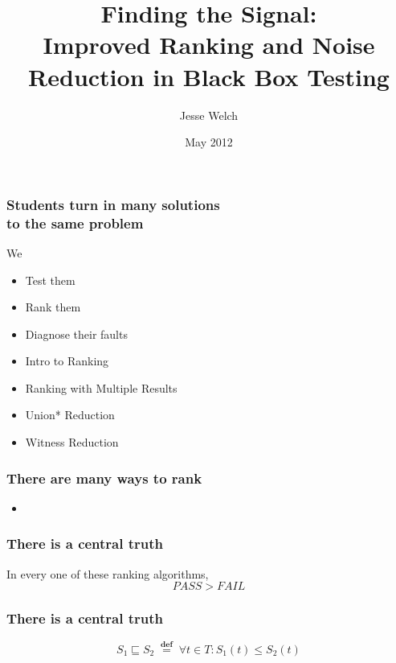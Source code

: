 \documentclass[svgnames,14pt]{beamer}
\title[Finding the Signal]{Finding the Signal:\\
Improved Ranking and Noise Reduction in Black Box Testing}
\author{Jesse Welch}
\institute{Tufts University}
\date{May 2012}
\newcommand\fail{\mathit{FAIL}}
\newcommand\pass{\mathit{PASS}}
\newcommand\defined{\mathrel{\;\stackrel{\scriptscriptstyle\mathbf{def}}{=}\;}}
\theoremstyle{definition}
\begin{document}
\begin{frame}
\maketitle
\end{frame}


\begin{frame}
\frametitle{Students turn in many solutions \\ to the same problem}
We 
\begin{itemize}
\item Test them \only<2->{\textbf{cheaply}}
\item Rank them 
\item Diagnose their faults 
\end{itemize}
\end{frame}

\begin{frame}
\begin{itemize}
\frametitle{Overview}
\item<1-2> Intro to Ranking
\item<1> Ranking with Multiple Results
\item<1> Union* Reduction
\item<1> Witness Reduction
\end{itemize}
\end{frame}

\begin{frame}
\frametitle{There are many ways to rank}
\begin{itemize}
\item {}
\end{itemize}
\end{frame}

\begin{frame}
\frametitle{There is a central truth}
In every one of these ranking algorithms,
$$\pass>\fail$$
\end{frame}

\begin{frame}
\frametitle{There is a central truth}
\begin{block}{}
$$S_1 \sqsubseteq S_2 \defined \forall t \in T : S_1(t) \leq S_2(t)$$
\end{block}
\end{frame}
\end{document}
